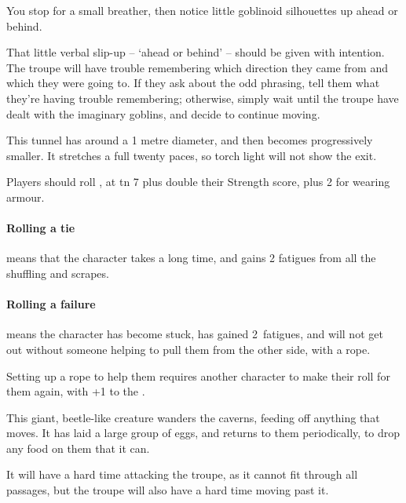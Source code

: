\begin{multicols}{2}
\begin{boxtext}
  You stop for a small breather, then notice little goblinoid silhouettes up ahead or behind.
\end{boxtext}

That little verbal slip-up -- `ahead or behind' -- should be given with intention.
The troupe will have trouble remembering which direction they came from and which they were going to.
If they ask about the odd phrasing, tell them what they're having trouble remembering; otherwise, simply wait until the troupe have dealt with the imaginary goblins, and decide to continue moving.


This tunnel has around a 1 metre diameter, and then becomes progressively smaller.
It stretches a full twenty paces, so torch light will not show the exit.

Players should roll , at \gls{tn} 7 plus double their Strength score, plus 2 for wearing armour.

\paragraph{Rolling a tie}
means that the character takes a long time, and gains 2 \glspl{fatigue} from all the shuffling and scrapes.

\paragraph{Rolling a failure}
means the character has become stuck, has gained 2~\glspl{fatigue}, and will not get out without someone helping to pull them from the other side, with a rope.

Setting up a rope to help them requires another character to make their roll for them again, with +1 to the .


This giant, beetle-like creature%
wanders the caverns, feeding off anything that moves.
It has laid a large group of eggs, and returns to them periodically, to drop any food on them that it can.

It will have a hard time attacking the troupe, as it cannot fit through all passages, but the troupe will also have a hard time moving past it.

\umberhulk


\end{multicols}
